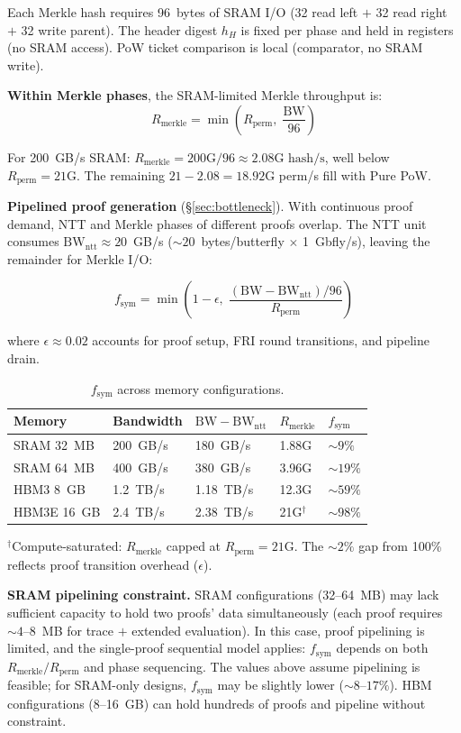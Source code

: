 \documentclass[11pt,a4paper]{article}
\begin{document}
Each Merkle hash requires 96~bytes of SRAM I/O (32 read left $+$ 32 read right $+$ 32 write parent). The header digest $h_H$ is fixed per phase and held in registers (no SRAM access). PoW ticket comparison is local (comparator, no SRAM write).

\textbf{Within Merkle phases}, the SRAM-limited Merkle throughput is:
$$R_{\mathrm{merkle}} = \min\!\left(R_{\mathrm{perm}},\; \frac{\mathrm{BW}}{96}\right)$$

For 200~GB/s SRAM: $R_{\mathrm{merkle}} = 200\text{G}/96 \approx 2.08\text{G hash/s}$, well below $R_{\mathrm{perm}} = 21\text{G}$. The remaining $21 - 2.08 = 18.92$G perm/s fill with Pure PoW.

\textbf{Pipelined proof generation} (\S\ref{sec:bottleneck}). With continuous proof demand, NTT and Merkle phases of different proofs overlap. The NTT unit consumes $\mathrm{BW}_{\mathrm{ntt}} \approx 20$~GB/s (${\sim}20$~bytes/butterfly $\times$ 1~Gbfly/s), leaving the remainder for Merkle I/O:

$$f_{\mathrm{sym}} = \min\!\left(1 - \epsilon,\; \frac{(\mathrm{BW} - \mathrm{BW}_{\mathrm{ntt}})/96}{R_{\mathrm{perm}}}\right)$$

where $\epsilon \approx 0.02$ accounts for proof setup, FRI round transitions, and pipeline drain.

\begin{table}[h]
\centering
\begin{tabular}{@{}lllll@{}}
\toprule
Memory & Bandwidth & $\mathrm{BW} - \mathrm{BW}_{\mathrm{ntt}}$ & $R_{\mathrm{merkle}}$ & $f_{\mathrm{sym}}$ \\
\midrule
SRAM 32~MB & 200~GB/s & 180~GB/s & 1.88G & ${\sim}9\%$ \\
SRAM 64~MB & 400~GB/s & 380~GB/s & 3.96G & ${\sim}19\%$ \\
HBM3 8~GB & 1.2~TB/s & 1.18~TB/s & 12.3G & ${\sim}59\%$ \\
HBM3E 16~GB & 2.4~TB/s & 2.38~TB/s & 21G$^\dagger$ & ${\sim}98\%$ \\
\bottomrule
\end{tabular}
\caption{$f_{\mathrm{sym}}$ across memory configurations.}
\label{tab:fsym}
\end{table}

$^\dagger$Compute-saturated: $R_{\mathrm{merkle}}$ capped at $R_{\mathrm{perm}} = 21$G. The ${\sim}2\%$ gap from 100\% reflects proof transition overhead ($\epsilon$).

\textbf{SRAM pipelining constraint.} SRAM configurations (32--64~MB) may lack sufficient capacity to hold two proofs' data simultaneously (each proof requires ${\sim}4$--$8$~MB for trace $+$ extended evaluation). In this case, proof pipelining is limited, and the single-proof sequential model applies: $f_{\mathrm{sym}}$ depends on both $R_{\mathrm{merkle}}/R_{\mathrm{perm}}$ and phase sequencing. The values above assume pipelining is feasible; for SRAM-only designs, $f_{\mathrm{sym}}$ may be slightly lower (${\sim}8$--$17\%$). HBM configurations (8--16~GB) can hold hundreds of proofs and pipeline without constraint.
\end{document}
